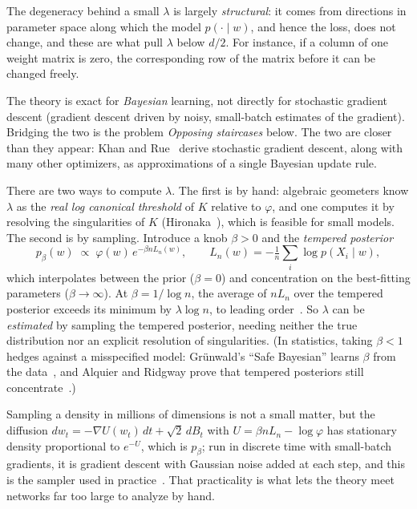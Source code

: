 The degeneracy behind a small $\lambda$ is largely \emph{structural}: it comes from directions in parameter space along which the model $p(\cdot\mid w)$, and hence the loss, does not change, and these are what pull $\lambda$ below $d/2$. For instance, if a column of one weight matrix is zero, the corresponding row of the matrix before it can be changed freely.

The theory is exact for \emph{Bayesian} learning, not directly for stochastic gradient descent (gradient descent driven by noisy, small-batch estimates of the gradient). Bridging the two is the problem \emph{Opposing staircases} below. The two are closer than they appear: Khan and Rue~\cite{khan2023} derive stochastic gradient descent, along with many other optimizers, as approximations of a single Bayesian update rule.

There are two ways to compute $\lambda$. The first is by hand: algebraic geometers know $\lambda$ as the \emph{real log canonical threshold} of $K$ relative to $\varphi$, and one computes it by resolving the singularities of $K$ (Hironaka~\cite{hironaka1964}), which is feasible for small models. The second is by sampling. Introduce a knob $\beta>0$ and the \emph{tempered posterior}
\[
   p_\beta(w)\;\propto\;\varphi(w)\,e^{-\beta n L_n(w)},
   \qquad L_n(w)=-\tfrac1n\textstyle\sum_i\log p(X_i\mid w),
\]
which interpolates between the prior ($\beta=0$) and concentration on the best-fitting parameters ($\beta\to\infty$). At $\beta=1/\log n$, the average of $nL_n$ over the tempered posterior exceeds its minimum by $\lambda\log n$, to leading order~\cite{watanabe2013}. So $\lambda$ can be \emph{estimated} by sampling the tempered posterior, needing neither the true distribution nor an explicit resolution of singularities. (In statistics, taking $\beta<1$ hedges against a misspecified model: Gr\"unwald's ``Safe Bayesian'' learns $\beta$ from the data~\cite{grunwald2012}, and Alquier and Ridgway prove that tempered posteriors still concentrate~\cite{alquier2020}.)

Sampling a density in millions of dimensions is not a small matter, but the diffusion $dw_t=-\nabla U(w_t)\,dt+\sqrt2\,dB_t$ with $U=\beta nL_n-\log\varphi$ has stationary density proportional to $e^{-U}$, which is $p_\beta$; run in discrete time with small-batch gradients, it is gradient descent with Gaussian noise added at each step, and this is the sampler used in practice~\cite{lau2023}. That practicality is what lets the theory meet networks far too large to analyze by hand.

